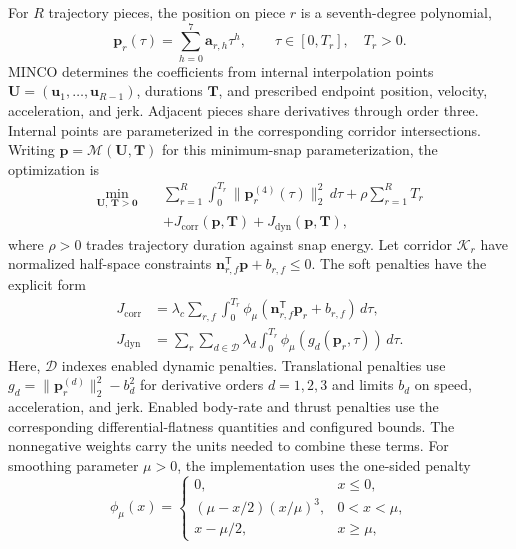 \documentclass[letterpaper,10pt,journal]{IEEEtran}
\begin{document}
For $R$ trajectory pieces, the position on piece $r$ is a seventh-degree polynomial,
\begin{equation}
\mathbf p_r(\tau)=\sum_{h=0}^{7}\mathbf a_{r,h}\tau^h,
\qquad \tau\in[0,T_r],\quad T_r>0.
\label{eq:trajectory-piece}
\end{equation}
MINCO determines the coefficients from internal interpolation points $\mathbf U=(\mathbf u_1,\ldots,\mathbf u_{R-1})$, durations $\mathbf T$, and prescribed endpoint position, velocity, acceleration, and jerk. Adjacent pieces share derivatives through order three. Internal points are parameterized in the corresponding corridor intersections. Writing $\mathbf p=\mathcal M(\mathbf U,\mathbf T)$ for this minimum-snap parameterization, the optimization is
\begin{equation}
\begin{aligned}
\min_{\mathbf U,\,\mathbf T>\mathbf 0}\quad
&\sum_{r=1}^{R}\int_0^{T_r}\|\mathbf p_r^{(4)}(\tau)\|_2^2\,d\tau
+\rho\sum_{r=1}^{R}T_r\\
&+J_{\mathrm{corr}}(\mathbf p,\mathbf T)
+J_{\mathrm{dyn}}(\mathbf p,\mathbf T),
\end{aligned}
\label{eq:minco-safe-corridor}
\end{equation}
where $\rho>0$ trades trajectory duration against snap energy. Let corridor $\mathcal K_r$ have normalized half-space constraints $\mathbf n_{r,f}^{\mathsf T}\mathbf p+b_{r,f}\leq0$. The soft penalties have the explicit form
\begin{equation}
\begin{aligned}
J_{\mathrm{corr}}&=\lambda_c\sum_{r,f}\int_0^{T_r}
\phi_\mu(\mathbf n_{r,f}^{\mathsf T}\mathbf p_r+b_{r,f})\,d\tau,\\
J_{\mathrm{dyn}}&=\sum_{r}\sum_{d\in\mathcal D}\lambda_d
\int_0^{T_r}\phi_\mu(g_d(\mathbf p_r,\tau))\,d\tau.
\end{aligned}
\label{eq:minco-penalties}
\end{equation}
Here, $\mathcal D$ indexes enabled dynamic penalties. Translational penalties use $g_d=\|\mathbf p_r^{(d)}\|_2^2-b_d^2$ for derivative orders $d=1,2,3$ and limits $b_d$ on speed, acceleration, and jerk. Enabled body-rate and thrust penalties use the corresponding differential-flatness quantities and configured bounds. The nonnegative weights carry the units needed to combine these terms. For smoothing parameter $\mu>0$, the implementation uses the one-sided penalty
\begin{equation}
\phi_\mu(x)=
\begin{cases}
0,&x\leq0,\\
(\mu-x/2)(x/\mu)^3,&0<x<\mu,\\
x-\mu/2,&x\geq\mu,
\end{cases}
\label{eq:smooth-penalty}
\end{equation}
\end{document}
